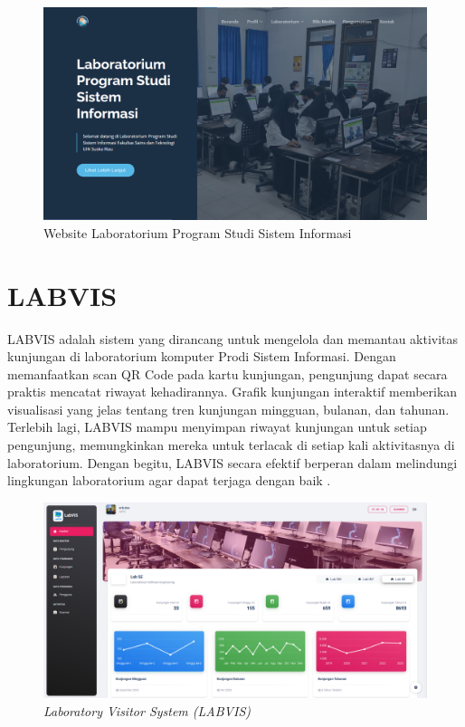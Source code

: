 \begin{figure}
	\centering
	\includegraphics[width=0.82\linewidth]{konten//gambar/labsi.png}
	\caption{Website Laboratorium Program Studi Sistem Informasi \protect\cite{web-prodi}}
	\label{fig:enter-label}
\end{figure}

\section{LABVIS}
LABVIS adalah sistem yang dirancang untuk mengelola dan memantau aktivitas kunjungan di laboratorium komputer Prodi Sistem Informasi. Dengan memanfaatkan scan QR Code pada kartu kunjungan, pengunjung dapat secara praktis mencatat riwayat kehadirannya. Grafik kunjungan interaktif memberikan visualisasi yang jelas tentang tren kunjungan mingguan, bulanan, dan tahunan. Terlebih lagi, LABVIS mampu menyimpan riwayat kunjungan untuk setiap pengunjung, memungkinkan mereka untuk terlacak di setiap kali aktivitasnya di laboratorium. Dengan begitu, LABVIS secara efektif berperan dalam melindungi lingkungan laboratorium agar dapat terjaga dengan baik \cite{web-prodi}.

\begin{figure}
	\centering
	\includegraphics[width=0.82\linewidth]{konten//gambar/labvis.png}
	\caption{\textit{Laboratory Visitor System (LABVIS)} \protect\cite{web-prodi}}
	\label{fig:enter-label}
\end{figure}

